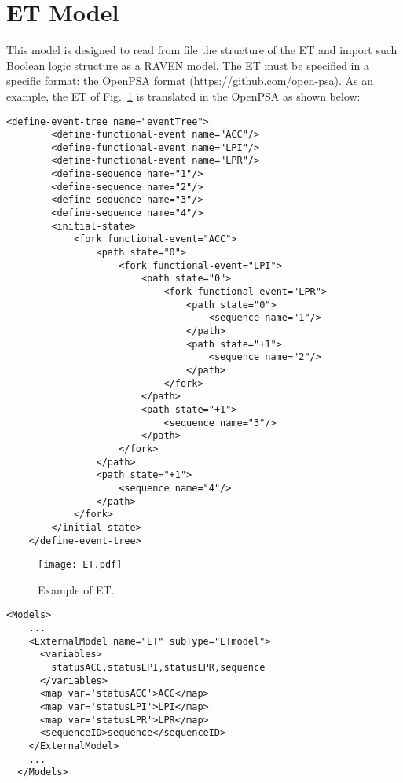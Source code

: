 \section{ET Model}
\label{sec:ETmodel}

This model is designed to read from file the structure of the ET and import such Boolean logic structure as a RAVEN model.
The ET must be specified in a specific format: the OpenPSA format (\href{<url>}{https://github.com/open-psa}). 
As an example, the ET of Fig.~\ref{fig:ET} is translated in the OpenPSA as shown below:

\begin{lstlisting}[style=XML,morekeywords={anAttribute},caption=ETmodel input example., label=lst:ETmodel]
	<define-event-tree name="eventTree">
	    <define-functional-event name="ACC"/>
	    <define-functional-event name="LPI"/>
	    <define-functional-event name="LPR"/>
	    <define-sequence name="1"/>
	    <define-sequence name="2"/>
	    <define-sequence name="3"/>
	    <define-sequence name="4"/>
	    <initial-state>
	        <fork functional-event="ACC">
	            <path state="0">
	                <fork functional-event="LPI">
	                    <path state="0">
	                        <fork functional-event="LPR">
	                            <path state="0">
	                                <sequence name="1"/>
	                            </path>
	                            <path state="+1">
	                                <sequence name="2"/>
	                            </path>
	                        </fork>
	                    </path>
	                    <path state="+1">
	                        <sequence name="3"/>
	                    </path>
	                </fork>
	            </path>
	            <path state="+1">
	                <sequence name="4"/>
	            </path>
	        </fork>
	    </initial-state>
	</define-event-tree>
\end{lstlisting} 

\begin{figure}
    \centering
    \centerline{\texttt{[image: ET.pdf]}} 
    \caption{Example of ET.}
    \label{fig:ET}
\end{figure}

\begin{lstlisting}[style=XML,morekeywords={anAttribute},caption=ETmodel input example., label=lst:ET_InputExample]
  <Models> 
    ...
    <ExternalModel name="ET" subType="ETmodel">
      <variables>
        statusACC,statusLPI,statusLPR,sequence
      </variables>
      <map var='statusACC'>ACC</map>
      <map var='statusLPI'>LPI</map>
      <map var='statusLPR'>LPR</map>
      <sequenceID>sequence</sequenceID>
    </ExternalModel>
    ...
  </Models>
\end{lstlisting}


